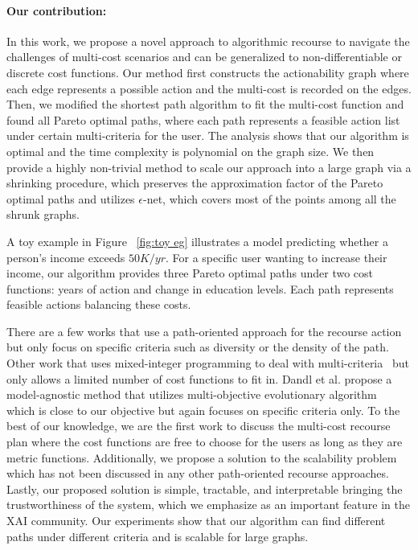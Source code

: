 \paragraph{Our contribution:} %
In this work, we propose a novel approach to algorithmic recourse to navigate the challenges of multi-cost scenarios and can be generalized to non-differentiable or discrete cost functions. Our method first constructs the actionability graph where each edge represents a possible action and the multi-cost is recorded on the edges. Then, we modified the shortest path algorithm to fit the multi-cost function and found all Pareto optimal paths, where each path represents a feasible action list under certain multi-criteria for the user. The analysis shows that our algorithm is optimal and the time complexity is polynomial on the graph size. We then provide a highly non-trivial method to scale our approach into a large graph via a shrinking procedure, which preserves the approximation factor of the Pareto optimal paths and utilizes $\epsilon$-net, which covers most of the points among all the shrunk graphs. 


A toy example in Figure ~\ref{fig:toy eg} illustrates a model predicting whether a person's income exceeds $50K/yr$. For a specific user wanting to increase their income, our algorithm provides three Pareto optimal paths under two cost functions: years of action and change in education levels. Each path represents feasible actions balancing these costs.


There are a few works that use a path-oriented approach for the recourse action~\cite{poyiadzi2020face,nguyen2023feasible} but only focus on specific criteria such as diversity or the density of the path. Other work that uses mixed-integer programming to deal with multi-criteria~\cite{russell2019efficient,mothilal2020explaining} but only allows a limited number of cost functions to fit in. Dandl et al. propose a model-agnostic method that utilizes multi-objective evolutionary algorithm~\cite{dandl2020multi} which is close to our objective but again focuses on specific criteria only. To the best of our knowledge, we are the first work to discuss the multi-cost recourse plan where the cost functions are free to choose for the users as long as they are metric functions. Additionally, we propose a solution to the scalability problem which has not been discussed in any other path-oriented recourse approaches. Lastly, our proposed solution is simple, tractable, and interpretable bringing the trustworthiness of the system, which we emphasize as an important feature in the XAI community. Our experiments show that our algorithm can find different paths under different criteria and is scalable for large graphs.




